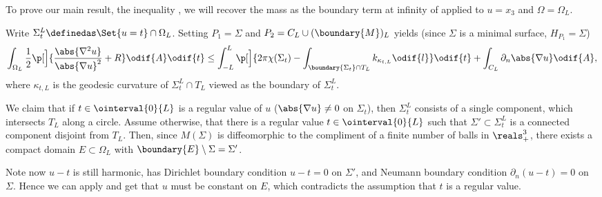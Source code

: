 \documentclass[titlepage,numbers=noenddot,headinclude,oneside,%
footinclude=true,cleardoublepage=empty,%
BCOR=5mm,paper=a4,fontsize=11pt,%
english,%
]{scrartcl}
\begin{document}
\newcommand{\nonzeroboundary}{\partial_{\neq 0}M^L}\newcommand{\maxu}{\bar{u}}
\newcommand{\minu}{\underline{u}}
To prove our main result, the inequality , we will recover the mass as the boundary term at infinity of  applied to \( u=x_3 \) and \( \Omega=\Omega_L \). 

Write \( \Sigma_t^L\definedas \Set{u=t}\cap \Omega_L \). Setting \( P_1=\Sigma\) and \( P_2=C_L\cup (\boundary{M})_L \) yields (since \( \Sigma \) is a minimal surface, \ie \( H_{P_1}=\Sigma \))
\begin{equation}
    \int_{\Omega_L} \frac{1}{2}\p[\Big]{\frac{\abs{\nabla^2 u}}{\abs{\nabla u}^2}+R }\odif{A}\odif{t} \leq\int_{-L}^{L}\p[\Big]{2\pi \chi(\Sigma_t)-\int _{\boundary{\Sigma_t} \cap T_L}k_{\kappa_{t,L}}\odif{l}}\odif{t}+ \int_{C_L}\partial_{n} \abs{\nabla u}\odif{A},\label{eq:just_insert_cylinder_into_main_identity}
\end{equation}
where \( \kappa_{t,L} \) is the geodesic curvature of \( \Sigma_{t}^L \cap T_L\) viewed as the boundary of \( \Sigma_t^L \).

We claim that if \( t\in \ointerval{0}{L} \) is a regular value of \( u \) (\ie \( \abs{\nabla u}\neq 0 \) on \( \Sigma_t \)), then \( \Sigma_t^L \) consists of a single component, which intersects \( T_L \) along a circle. Assume otherwise, \ie that there is a regular value \( t\in \ointerval{0}{L} \) such that \( \Sigma'\subset \Sigma_t^L \) is a connected component disjoint from \( T_L \). Then, since \( M(\Sigma) \) is diffeomorphic to the compliment of a finite number of balls in \( \reals^3_+ \), there exists a compact domain \( E\subset \Omega_L \) with \( \boundary{E}\setminus \Sigma=\Sigma' \). 

Note now \( u-t \) is still harmonic, has Dirichlet boundary condition \( u-t=0 \) on \( \Sigma' \), and Neumann boundary condition \( \partial_n (u-t)=0 \) on \( \Sigma \). Hence we can apply  and get that \( u \) must be constant on \( E \), which contradicts the assumption that \( t \) is a regular value.
\end{document}
